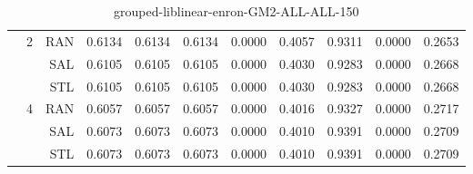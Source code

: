 \begin{center}
\begin{table}[htbp]
\begin{tabular}{ | r | r | r | r | r | r | r | r | r | r | r |}
 & \multirow{3}{*}{2} & RAN & 0.6134 & 0.6134 & 0.6134 & 0.0000 & 0.4057 & 0.9311 & 0.0000 & 0.2653\\ \cline{3-11}
 &   & SAL & 0.6105 & 0.6105 & 0.6105 & 0.0000 & 0.4030 & 0.9283 & 0.0000 & 0.2668\\ \cline{3-11}
 &   & STL & 0.6105 & 0.6105 & 0.6105 & 0.0000 & 0.4030 & 0.9283 & 0.0000 & 0.2668\\ \cline{2-11}
 & \multirow{3}{*}{4} & RAN & 0.6057 & 0.6057 & 0.6057 & 0.0000 & 0.4016 & 0.9327 & 0.0000 & 0.2717\\ \cline{3-11}
 &   & SAL & 0.6073 & 0.6073 & 0.6073 & 0.0000 & 0.4010 & 0.9391 & 0.0000 & 0.2709\\ \cline{3-11}
 &   & STL & 0.6073 & 0.6073 & 0.6073 & 0.0000 & 0.4010 & 0.9391 & 0.0000 & 0.2709\\ \cline{2-11}
\hline
\end{tabular}
\caption{grouped-liblinear-enron-GM2-ALL-ALL-150}
\end{table}
\end{center}

